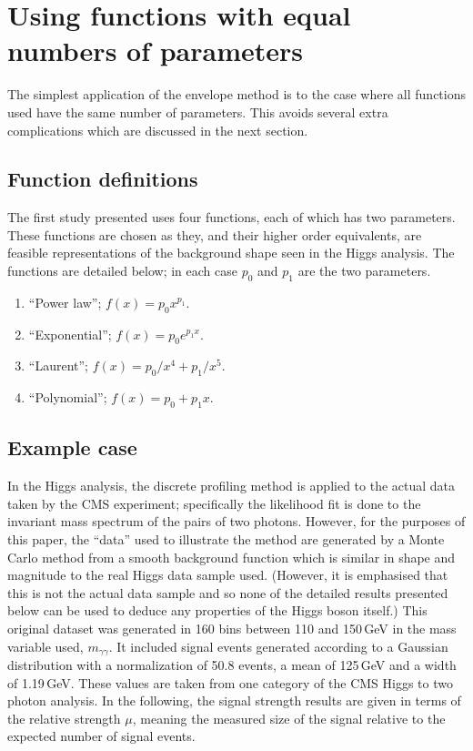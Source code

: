 \section{Using functions with equal numbers of parameters} %
\label{sec:functions}

The simplest application of the envelope method is to the case where all
functions used have the same number of parameters. This avoids several extra
complications which are discussed in the next section.

\subsection{Function definitions}
\label{sec:functions:function}

The first study presented uses four functions, each of which has two parameters.
These functions are chosen as they, and their higher order equivalents,
are feasible representations of the background shape seen in the Higgs
analysis. The functions are detailed below; in each case $p_0$ and $p_1$ are
the two parameters.
\begin{enumerate}
\item
``Power law''; $f(x) = p_0 x^{p_1}$.
\item
``Exponential''; $f(x) = p_0 e^{p_1x}$.
\item
``Laurent''; $f(x) = p_0/x^4 + p_1/x^5$.
\item
``Polynomial''; $f(x) = p_0 + p_1 x$.
\end{enumerate}

\subsection{Example case}
\label{sec:functions:example}

In the Higgs analysis, the discrete profiling method is applied to
the actual data taken by the CMS experiment; specifically the likelihood fit
is done to the invariant mass spectrum of the pairs of two photons.
However, for the purposes of this
paper, the ``data'' used to illustrate the method are generated by a Monte Carlo
method from a smooth background
function which is similar in shape and magnitude to the
real Higgs data sample used. (However, it is emphasised that this is not the 
actual data sample and so 
none of the detailed results presented below can be used to deduce any
properties of the Higgs boson itself.)
This original dataset was generated in 160 bins between 110 and 150\,GeV in
the mass variable used, $m_{\gamma\gamma}$.
It included signal events
generated according to a Gaussian distribution with a normalization of 50.8 events, a mean of 125\,GeV and a 
width of 1.19\,GeV. These values are taken from one category of the CMS Higgs to two photon analysis.
In the following, the signal strength results are given in
terms of the relative strength $\mu$, 
meaning the measured size of the signal relative
to the expected number of signal events. 


